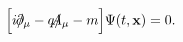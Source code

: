 \begin{equation}
\Bigl[ i \slash{\hspace{-0.2cm}}{\partial}_{\mu} - 
q \slash{\hspace{-0.25cm}}{A}_{\mu}  - m 
\Bigr] \Psi (t, {\bf x}) = 0. \label{dirac eq}
\end{equation}

